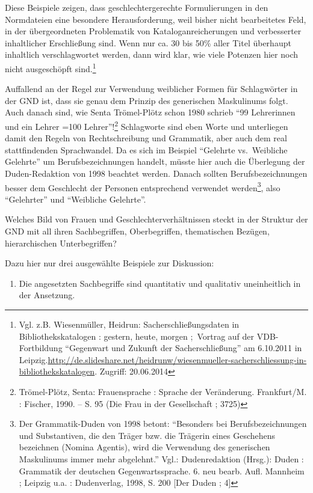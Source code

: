 \documentclass[a4paper,
fontsize=11pt,
oneside,
numbers=noperiodatend,
parskip=half-,
bibliography=totoc,
final
]{scrartcl}
\begin{document}
Diese Beispiele zeigen, dass geschlechtergerechte Formulierungen in den
Normdateien eine besondere Herausforderung, weil bisher nicht
bearbeitetes Feld, in der übergeordneten Problematik von
Kataloganreicherungen und verbesserter inhaltlicher Erschließung sind.
Wenn nur ca. 30 bis 50\% aller Titel überhaupt inhaltlich
verschlagwortet werden, dann wird klar, wie viele Potenzen hier noch
nicht ausgeschöpft sind.\footnote{Vgl. z.B. Wiesenmüller, Heidrun:
  Sacherschließungsdaten in Bibliothekskatalogen : gestern, heute,
  morgen ;~Vortrag auf der VDB-Fortbildung \enquote{Gegenwart und
  Zukunft der Sacherschließung} am 6.10.2011 in
  Leipzig.\url{http://de.slideshare.net/heidrunw/wiesenmueller-sacherschliessung-in-bibliothekskatalogen}.
  Zugriff: 20.06.2014}

Auffallend an der Regel zur Verwendung weiblicher Formen für
Schlagwörter in der GND ist, dass sie genau dem Prinzip des generischen
Maskulinums folgt. Auch danach sind, wie Senta Trömel-Plötz schon 1980
schrieb \enquote{99 Lehrerinnen und ein Lehrer =100 Lehrer}!\footnote{Trömel-Plötz,
  Senta: Frauensprache : Sprache der Veränderung. Frankfurt/M. :
  Fischer, 1990. -- S. 95 (Die Frau in der Gesellschaft ; 3725)}
Schlagworte sind eben Worte und unterliegen damit den Regeln von
Rechtschreibung und Grammatik, aber auch dem real stattfindenden
Sprachwandel. Da es sich im Beispiel \enquote{Gelehrte vs.~Weibliche
Gelehrte} um Berufsbezeichnungen handelt, müsste hier auch die
Überlegung der Duden-Redaktion von 1998 beachtet werden. Danach sollten
Berufsbezeichnungen besser dem Geschlecht der Personen entsprechend
verwendet werden\footnote{Der Grammatik-Duden von 1998 betont:
  \enquote{Besonders bei Berufsbezeichnungen und Substantiven, die den
  Träger bzw. die Trägerin eines Geschehens bezeichnen (Nomina Agentis),
  wird die Verwendung des generischen Maskulinums immer mehr abgelehnt.}
  Vgl.: Dudenredaktion (Hrsg.): Duden : Grammatik der deutschen
  Gegenwartssprache. 6. neu bearb. Aufl. Mannheim ; Leipzig u.a. :
  Dudenverlag, 1998, S. 200 {[}Der Duden ; 4{]}}, also
\enquote{Gelehrter} und \enquote{Weibliche Gelehrte}.

Welches Bild von Frauen und Geschlechterverhältnissen steckt in der
Struktur der GND mit all ihren Sachbegriffen, Oberbegriffen,
thematischen Bezügen, hierarchischen Unterbegriffen?

Dazu hier nur drei ausgewählte Beispiele zur Diskussion:

\begin{enumerate}
\def\labelenumi{\arabic{enumi}.}
\itemsep1pt\parskip0pt
\item
  Die angesetzten Sachbegriffe sind quantitativ und qualitativ
  uneinheitlich in der Ansetzung.
\end{enumerate}
\end{document}
